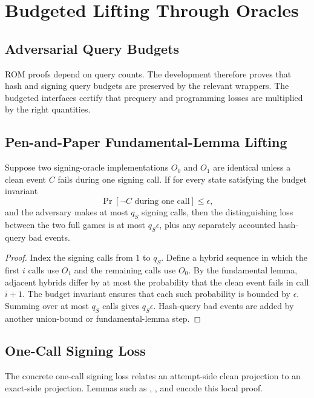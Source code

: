 \chapter{Budgeted Lifting Through Oracles}
\label{ch:budgeted}

\section{Adversarial Query Budgets}

ROM proofs depend on query counts.  The development therefore proves that hash
and signing query budgets are preserved by the relevant wrappers.  The budgeted
interfaces certify that prequery and programming losses are multiplied by the
right quantities.

\section{Pen-and-Paper Fundamental-Lemma Lifting}

\begin{lemma}
Suppose two signing-oracle implementations \(O_0\) and \(O_1\) are identical
unless a clean event \(C\) fails during one signing call.  If for every state
satisfying the budget invariant
\[
\Pr[\neg C\text{ during one call}]\le \epsilon,
\]
and the adversary makes at most \(q_S\) signing calls, then the distinguishing
loss between the two full games is at most \(q_S\epsilon\), plus any separately
accounted hash-query bad events.
\end{lemma}

\begin{proof}
Index the signing calls from \(1\) to \(q_S\).  Define a hybrid sequence in
which the first \(i\) calls use \(O_1\) and the remaining calls use \(O_0\).  By
the fundamental lemma, adjacent hybrids differ by at most the probability that
the clean event fails in call \(i+1\).  The budget invariant ensures that each
such probability is bounded by \(\epsilon\).  Summing over at most \(q_S\) calls
gives \(q_S\epsilon\).  Hash-query bad events are added by another union-bound
or fundamental-lemma step.
\end{proof}

\section{One-Call Signing Loss}

The concrete one-call signing loss relates an attempt-side clean projection to
an exact-side projection.  Lemmas such as
,
,
and
encode this local proof.

